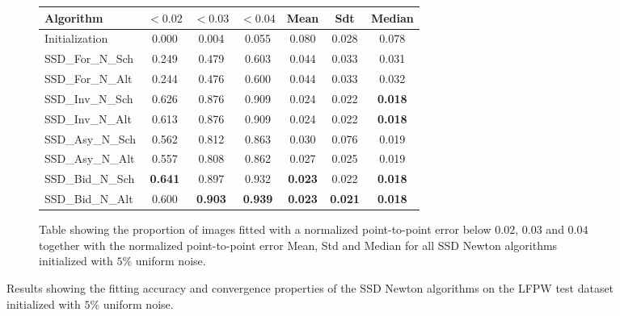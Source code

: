 \begin{figure}[p]
\begin{subfigure}{0.48\textwidth}
	    \label{fig:mean_cost_vs_iters2_ssd_n_5}
	\end{subfigure}
	\par\bigskip\bigskip
	\begin{subfigure}{\textwidth}
		\center
		\begin{tabular}{lcccccc}
			\toprule
		    Algorithm & $<0.02$ & $<0.03$ & $<0.04$ & Mean & Sdt & Median 
		    \\
		    \midrule
		    Initialization & 0.000 & 0.004 & 0.055 & 0.080 & 0.028 & 0.078
		    \\
		    SSD\_For\_N\_Sch & 0.249 & 0.479 & 0.603 & 0.044 & 0.033 & 0.031
		    \\
		    SSD\_For\_N\_Alt & 0.244 & 0.476 & 0.600 & 0.044 & 0.033 & 0.032
		    \\
		    SSD\_Inv\_N\_Sch & 0.626 & 0.876 & 0.909 & 0.024 & 0.022 & \textbf{0.018}
		    \\
		    SSD\_Inv\_N\_Alt & 0.613 & 0.876 & 0.909 & 0.024 & 0.022 & \textbf{0.018}
		    \\
		    SSD\_Asy\_N\_Sch & 0.562 & 0.812 & 0.863 & 0.030 & 0.076 & 0.019
		    \\
		    SSD\_Asy\_N\_Alt & 0.557 & 0.808 & 0.862 & 0.027 & 0.025 & 0.019
		    \\
		    SSD\_Bid\_N\_Sch & \textbf{0.641} & 0.897 & 0.932 & \textbf{0.023} & 0.022 & \textbf{0.018}
		    \\
		    SSD\_Bid\_N\_Alt & 0.600 & \textbf{0.903} & \textbf{0.939} & \textbf{0.023} & \textbf{0.021} & \textbf{0.018}
		    \\
		    \bottomrule
	  	\end{tabular}
	  	\caption{Table showing the proportion of images fitted with a normalized point-to-point error below $0.02$, $0.03$ and $0.04$ together with the normalized point-to-point error Mean, Std and Median for all SSD Newton algorithms initialized with $5\%$ uniform noise.}
	    \label{tab:stats_ssd_n_5}
	\end{subfigure}
	\caption{Results showing the fitting accuracy and convergence properties of the SSD Newton algorithms on the LFPW test dataset initialized with $5\%$ uniform noise.}
	\label{fig:ssd_n_5}
\end{figure}


